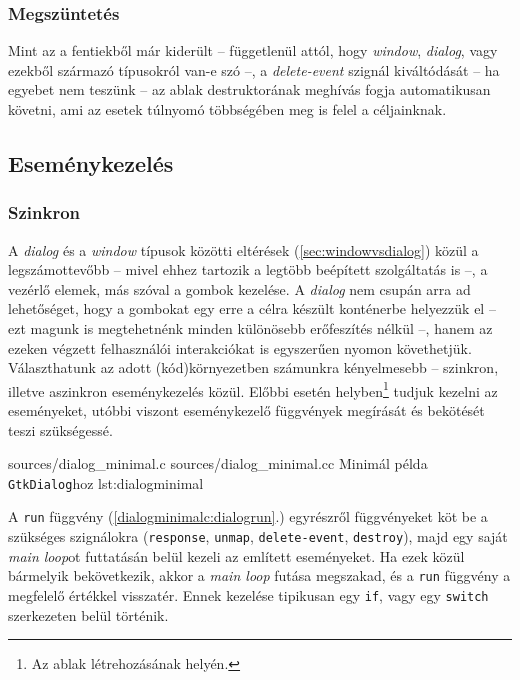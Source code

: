 \subsubsection{Megszüntetés}

Mint az a fentiekből már kiderült -- függetlenül attól, hogy \textit{window}, \textit{dialog}, vagy ezekből származó típusokról van-e szó --, a \textit{delete-event} szignál kiváltódását -- ha egyebet nem teszünk -- az ablak destruktorának meghívás fogja automatikusan követni, ami az esetek túlnyomó többségében meg is felel a céljainknak.

\subsection{Eseménykezelés}
\label{sec:dialogresponse}

\subsubsection{Szinkron}

A \textit{dialog} és a \textit{window} típusok közötti eltérések (\ref{sec:windowvsdialog}) közül a legszámottevőbb -- mivel ehhez tartozik a legtöbb beépített szolgáltatás is --, a vezérlő elemek, más szóval a gombok kezelése. A \textit{dialog} nem csupán arra ad lehetőséget, hogy a gombokat egy erre a célra készült konténerbe helyezzük el -- ezt magunk is megtehetnénk minden különösebb erőfeszítés nélkül --, hanem az ezeken végzett felhasználói interakciókat is egyszerűen nyomon követhetjük. Választhatunk az adott (kód)környezetben számunkra kényelmesebb -- szinkron, illetve aszinkron eseménykezelés közül. Előbbi esetén helyben\footnote{Az ablak létrehozásának helyén.} tudjuk kezelni az eseményeket, utóbbi viszont eseménykezelő függvények megírását és bekötését teszi szükségessé.

\lstinputsources
{sources/dialog_minimal.c}
{sources/dialog_minimal.cc}
{Minimál példa \texttt{GtkDialog}hoz}
{lst:dialogminimal}

A \texttt{run} függvény (\ref{dialogminimalc:dialogrun}.) egyrészről függvényeket köt be a szükséges szignálokra (\texttt{response}, \texttt{unmap}, \texttt{delete-event}, \texttt{destroy}), majd egy saját \textit{main loop}ot futtatásán belül kezeli az említett eseményeket. Ha ezek közül bármelyik bekövetkezik, akkor a \textit{main loop} futása megszakad, és a \texttt{run} függvény a megfelelő értékkel visszatér. Ennek kezelése tipikusan egy \texttt{if}, vagy egy \texttt{switch} szerkezeten belül történik.

